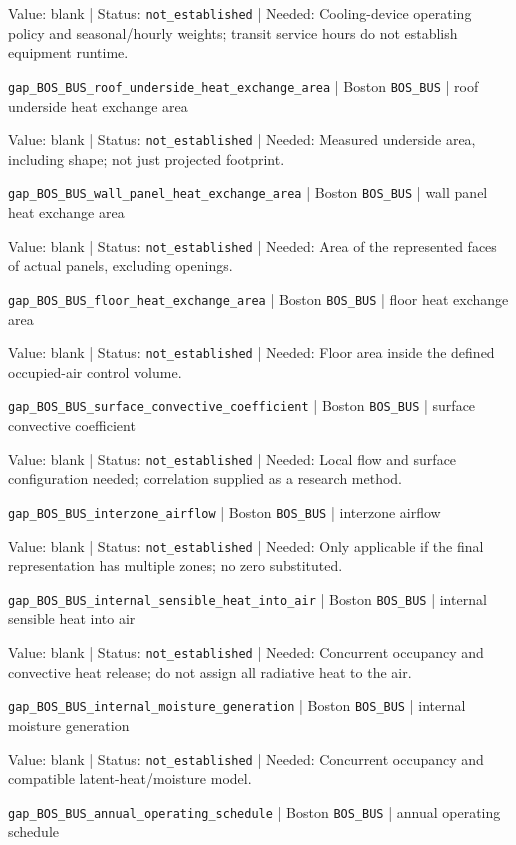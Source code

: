 Value: blank | Status: \nolinkurl{not_established} | Needed: Cooling-device operating policy and seasonal/hourly weights; transit service hours do not establish equipment runtime.

\nolinkurl{gap_BOS_BUS_roof_underside_heat_exchange_area} | Boston \nolinkurl{BOS_BUS}  | roof underside heat exchange area

Value: blank | Status: \nolinkurl{not_established} | Needed: Measured underside area, including shape; not just projected footprint.

\nolinkurl{gap_BOS_BUS_wall_panel_heat_exchange_area} | Boston \nolinkurl{BOS_BUS}  | wall panel heat exchange area

Value: blank | Status: \nolinkurl{not_established} | Needed: Area of the represented faces of actual panels, excluding openings.

\nolinkurl{gap_BOS_BUS_floor_heat_exchange_area} | Boston \nolinkurl{BOS_BUS}  | floor heat exchange area

Value: blank | Status: \nolinkurl{not_established} | Needed: Floor area inside the defined occupied-air control volume.

\nolinkurl{gap_BOS_BUS_surface_convective_coefficient} | Boston \nolinkurl{BOS_BUS}  | surface convective coefficient

Value: blank | Status: \nolinkurl{not_established} | Needed: Local flow and surface configuration needed; correlation supplied as a research method.

\nolinkurl{gap_BOS_BUS_interzone_airflow} | Boston \nolinkurl{BOS_BUS}  | interzone airflow

Value: blank | Status: \nolinkurl{not_established} | Needed: Only applicable if the final representation has multiple zones; no zero substituted.

\nolinkurl{gap_BOS_BUS_internal_sensible_heat_into_air} | Boston \nolinkurl{BOS_BUS}  | internal sensible heat into air

Value: blank | Status: \nolinkurl{not_established} | Needed: Concurrent occupancy and convective heat release; do not assign all radiative heat to the air.

\nolinkurl{gap_BOS_BUS_internal_moisture_generation} | Boston \nolinkurl{BOS_BUS}  | internal moisture generation

Value: blank | Status: \nolinkurl{not_established} | Needed: Concurrent occupancy and compatible latent-heat/moisture model.

\nolinkurl{gap_BOS_BUS_annual_operating_schedule} | Boston \nolinkurl{BOS_BUS}  | annual operating schedule

